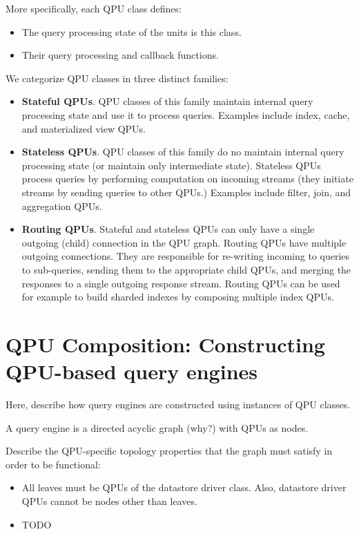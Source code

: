 More specifically, each QPU class defines:
\begin{itemize}
  \item The query processing state of the units is this class.
  \item Their query processing and callback functions.
\end{itemize}

We categorize QPU classes in three distinct families:
\begin{itemize}
  \item \textbf{Stateful QPUs}. QPU classes of this family maintain internal
  query processing state and use it to process queries.
  Examples include index, cache, and materialized view QPUs.
  \item \textbf{Stateless QPUs}. QPU classes of this family do no maintain
  internal query processing state (or maintain only intermediate state).
  Stateless QPUs process queries by performing computation on incoming streams
  (they initiate streams by sending queries to other QPUs.)
  Examples include filter, join, and aggregation QPUs.
  \item \textbf{Routing QPUs}. Stateful and stateless QPUs can only have a
  single outgoing (child) connection in the QPU graph.
  Routing QPUs have multiple outgoing connections.
  They are responsible for re-writing incoming to queries to sub-queries,
  sending them to the appropriate child QPUs, and merging the responses to a
  single outgoing response stream.
  Routing QPUs can be used for example to build sharded indexes by composing
  multiple index QPUs.
\end{itemize}

\section{QPU Composition: Constructing QPU-based query engines}
Here, describe how query engines are constructed using instances of QPU classes.

A query engine is a directed acyclic graph (why?) with QPUs as nodes.

Describe the QPU-specific topology properties that the graph must satisfy in
order to be functional:
\begin{itemize}
  \item All leaves must be QPUs of the datastore driver class.
  Also, datastore driver QPUs cannot be nodes other than leaves.
  \item TODO
\end{itemize}

